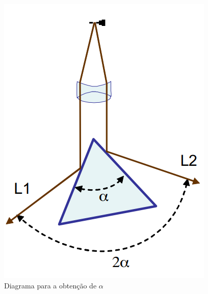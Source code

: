 \begin{figure}[H]
	\centering	    
	\includegraphics[scale=0.30]{figuras/alpha.png}
	\caption{Diagrama para a obtenção de $\alpha$}
	\label{fig:alpha}
\end{figure}